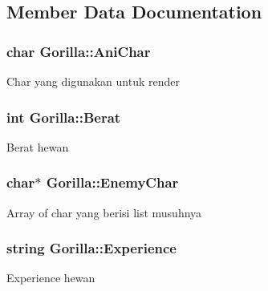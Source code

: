 \subsection{Member Data Documentation}
\subsubsection[{\texorpdfstring{Ani\+Char}{AniChar}}]{\setlength{\rightskip}{0pt plus 5cm}char Gorilla\+::\+Ani\+Char\hspace{0.3cm}{\ttfamily [protected]}}\hypertarget{class_gorilla_a037be2ef777e6836cbff27c93e875832}{}\label{class_gorilla_a037be2ef777e6836cbff27c93e875832}
Char yang digunakan untuk render 
\subsubsection[{\texorpdfstring{Berat}{Berat}}]{\setlength{\rightskip}{0pt plus 5cm}int Gorilla\+::\+Berat\hspace{0.3cm}{\ttfamily [protected]}}\hypertarget{class_gorilla_ad4ab0cf6dd1d3ccc029a40a7a38b6725}{}\label{class_gorilla_ad4ab0cf6dd1d3ccc029a40a7a38b6725}
Berat hewan 
\subsubsection[{\texorpdfstring{Enemy\+Char}{EnemyChar}}]{\setlength{\rightskip}{0pt plus 5cm}char$\ast$ Gorilla\+::\+Enemy\+Char\hspace{0.3cm}{\ttfamily [protected]}}\hypertarget{class_gorilla_a8b8fdb9fd62409ce197a9a5ade04a045}{}\label{class_gorilla_a8b8fdb9fd62409ce197a9a5ade04a045}
Array of char yang berisi list musuhnya 
\subsubsection[{\texorpdfstring{Experience}{Experience}}]{\setlength{\rightskip}{0pt plus 5cm}string Gorilla\+::\+Experience\hspace{0.3cm}{\ttfamily [protected]}}\hypertarget{class_gorilla_a796043a976b2b2b294521602aeb72522}{}\label{class_gorilla_a796043a976b2b2b294521602aeb72522}
Experience hewan 
